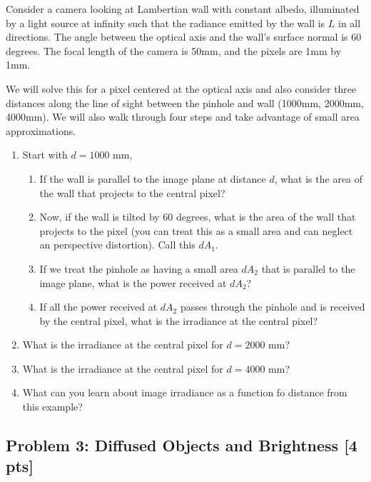 \documentclass[11pt]{article}
\providecommand{\tightlist}{%
      \setlength{\itemsep}{0pt}\setlength{\parskip}{0pt}}
\begin{document}
Consider a camera looking at Lambertian wall with constant albedo,
illuminated by a light source at infinity such that the radiance emitted
by the wall is \(L\) in all directions. The angle between the optical
axis and the wall's surface normal is 60 degrees. The focal length of
the camera is 50mm, and the pixels are 1mm by 1mm.

We will solve this for a pixel centered at the optical axis and also
consider three distances along the line of sight between the pinhole and
wall (1000mm, 2000mm, 4000mm). We will also walk through four steps and
take advantage of small area approximations.

\begin{enumerate}
\def\labelenumi{\arabic{enumi}.}
\tightlist
\item
  Start with \(d=1000\text{ mm}\),

  \begin{enumerate}
  \def\labelenumii{\arabic{enumii}.}
  \tightlist
  \item
    If the wall is parallel to the image plane at distance \(d\), what
    is the area of the wall that projects to the central pixel?
  \item
    Now, if the wall is tilted by 60 degrees, what is the area of the
    wall that projects to the pixel (you can treat this as a small area
    and can neglect an perspective distortion). Call this \(dA_{1}\).
  \item
    If we treat the pinhole as having a small area \(dA_{2}\) that is
    parallel to the image plane, what is the power received at
    \(dA_{2}\)?
  \item
    If all the power received at \(dA_{2}\) passes through the pinhole
    and is received by the central pixel, what is the irradiance at the
    central pixel?
  \end{enumerate}
\item
  What is the irradiance at the central pixel for \(d=2000\text{ mm}\)?
\item
  What is the irradiance at the central pixel for \(d=4000\text{ mm}\)?
\item
  What can you learn about image irradiance as a function fo distance
  from this example?
\end{enumerate}

    \hypertarget{problem-3-diffused-objects-and-brightness-4-pts}{%
\subsection{Problem 3: Diffused Objects and Brightness {[}4
pts{]}}\label{problem-3-diffused-objects-and-brightness-4-pts}}
\end{document}
